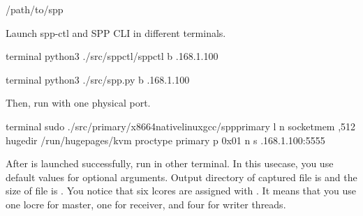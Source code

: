 \documentclass[a4paper,11pt,openany,oneside,english]{sphinxmanual}
\begin{document}
\begin{sphinxVerbatim}[commandchars=\\\{\},formatcom=\footnotesize]
  /path/to/spp
\end{sphinxVerbatim}

Launch spp-ctl and SPP CLI in different terminals.

\begin{sphinxVerbatim}[commandchars=\\\{\},formatcom=\footnotesize]
 terminal 
 python3 ./src/spp\PYGZhy{}ctl/spp\PYGZhy{}ctl \PYGZhy{}b .168.1.100
\end{sphinxVerbatim}

\begin{sphinxVerbatim}[commandchars=\\\{\},formatcom=\footnotesize]
 terminal 
 python3 ./src/spp.py \PYGZhy{}b .168.1.100
\end{sphinxVerbatim}

Then, run  with one physical port.

\begin{sphinxVerbatim}[commandchars=\\\{\},formatcom=\footnotesize]
 terminal 
 sudo ./src/primary/x86\PYGZus{}64\PYGZhy{}native\PYGZhy{}linux\PYGZhy{}gcc/spp\PYGZus{}primary 
    \PYGZhy{}l  \PYGZhy{}n  
    \PYGZhy{}\PYGZhy{}socket\PYGZhy{}mem ,512 
    \PYGZhy{}\PYGZhy{}huge\PYGZhy{}dir /run/hugepages/kvm 
    \PYGZhy{}\PYGZhy{}proc\PYGZhy{}type primary 
    \PYGZhy{}\PYGZhy{} 
    \PYGZhy{}p 0x01 
    \PYGZhy{}n  \PYGZhy{}s .168.1.100:5555
\end{sphinxVerbatim}

After  is launched successfully, run  in other
terminal. In this usecase, you use default values for optional arguments.
Output directory of captured file is  and the size of file is
.
You notice that six lcores are assigned with .
It means that you use one locre for master, one for receiver, and four for
writer threads.
\end{document}
